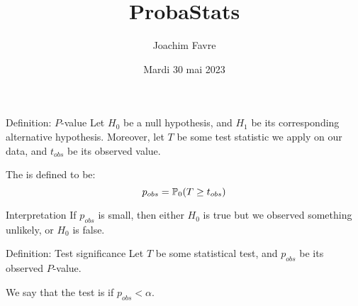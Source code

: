 \documentclass[a4paper]{article}
\title{ProbaStats}
\author{Joachim Favre}
\date{Mardi 30 mai 2023}
\begin{document}
\maketitle


\begin{parag}{Definition: $P$-value}
    Let $H_0$ be a null hypothesis, and $H_1$ be its corresponding alternative hypothesis. Moreover, let $T$ be some test statistic  we apply on our data, and $t_{obs}$ be its observed value.

    The  is defined to be: 
    \[p_{obs} = \prob_0\left(T \geq t_{obs}\right)\]

    \begin{subparag}{Interpretation}
        If $p_{obs}$ is small, then either $H_0$ is true but we observed something unlikely, or $H_0$ is false.
    \end{subparag}
\end{parag}

\begin{parag}{Definition: Test significance}
    Let $T$ be some statistical test, and $p_{obs}$ be its observed $P$-value.

    We say that the test is  if $p_{obs} < \alpha$.
\end{parag}
\end{document}
